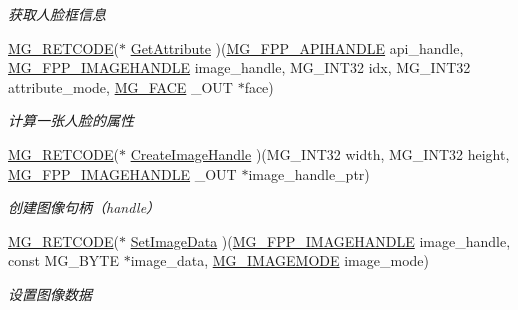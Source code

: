 \begin{DoxyCompactItemize}
\begin{DoxyCompactList}\small\item\em 获取人脸框信息 \end{DoxyCompactList}\item 
\hyperlink{_m_g___common_8h_a38fecb61b8c39592ddb51f75d4a5c5e7}{M\+G\+\_\+\+R\+E\+T\+C\+O\+DE}($\ast$ \hyperlink{struct_m_g___f_a_c_e_p_p___a_p_i___f_u_n_c_t_i_o_n_s___t_y_p_e_a4ac56d3f28fcb18a97bbbf847d38b2d3}{Get\+Attribute} )(\hyperlink{_m_g___facepp_8h_ada15f635ef909e9aca52824dd580da40}{M\+G\+\_\+\+F\+P\+P\+\_\+\+A\+P\+I\+H\+A\+N\+D\+LE} api\+\_\+handle, \hyperlink{_m_g___facepp_8h_a3492210206745444514ed588709ea666}{M\+G\+\_\+\+F\+P\+P\+\_\+\+I\+M\+A\+G\+E\+H\+A\+N\+D\+LE} image\+\_\+handle, M\+G\+\_\+\+I\+N\+T32 idx, M\+G\+\_\+\+I\+N\+T32 attribute\+\_\+mode, \hyperlink{struct_m_g___f_a_c_e}{M\+G\+\_\+\+F\+A\+CE} \+\_\+\+O\+UT $\ast$face)
\begin{DoxyCompactList}\small\item\em 计算一张人脸的属性 \end{DoxyCompactList}\item 
\hyperlink{_m_g___common_8h_a38fecb61b8c39592ddb51f75d4a5c5e7}{M\+G\+\_\+\+R\+E\+T\+C\+O\+DE}($\ast$ \hyperlink{struct_m_g___f_a_c_e_p_p___a_p_i___f_u_n_c_t_i_o_n_s___t_y_p_e_a77438b4530db1a84ce47ef285fd4129f}{Create\+Image\+Handle} )(M\+G\+\_\+\+I\+N\+T32 width, M\+G\+\_\+\+I\+N\+T32 height, \hyperlink{_m_g___facepp_8h_a3492210206745444514ed588709ea666}{M\+G\+\_\+\+F\+P\+P\+\_\+\+I\+M\+A\+G\+E\+H\+A\+N\+D\+LE} \+\_\+\+O\+UT $\ast$image\+\_\+handle\+\_\+ptr)
\begin{DoxyCompactList}\small\item\em 创建图像句柄（handle） \end{DoxyCompactList}\item 
\hyperlink{_m_g___common_8h_a38fecb61b8c39592ddb51f75d4a5c5e7}{M\+G\+\_\+\+R\+E\+T\+C\+O\+DE}($\ast$ \hyperlink{struct_m_g___f_a_c_e_p_p___a_p_i___f_u_n_c_t_i_o_n_s___t_y_p_e_aaea1483d888a49599be430406ea1b800}{Set\+Image\+Data} )(\hyperlink{_m_g___facepp_8h_a3492210206745444514ed588709ea666}{M\+G\+\_\+\+F\+P\+P\+\_\+\+I\+M\+A\+G\+E\+H\+A\+N\+D\+LE} image\+\_\+handle, const M\+G\+\_\+\+B\+Y\+TE $\ast$image\+\_\+data, \hyperlink{_m_g___common_8h_a27c660892b89a8f3b21116d59164d792}{M\+G\+\_\+\+I\+M\+A\+G\+E\+M\+O\+DE} image\+\_\+mode)
\begin{DoxyCompactList}\small\item\em 设置图像数据 \end{DoxyCompactList}\item 

\end{DoxyCompactItemize}

